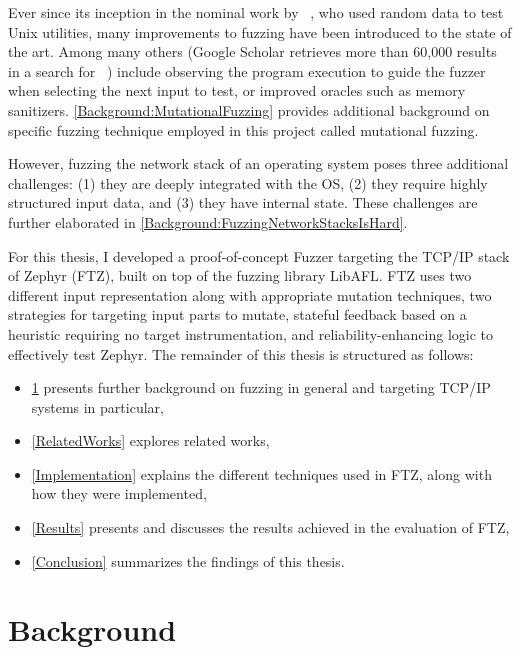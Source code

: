 \documentclass[twocolumn]{article}
\newcommand{\proj}{FTZ\xspace}
\let\savedCite=\cite
\renewcommand{\cite}{\unskip~\savedCite}
\begin{document}
Ever since its inception in the nominal work by \citeauthor{UNIX}\cite{UNIX}, who used random data to test Unix utilities, many improvements to fuzzing have been introduced to the state of the art. Among many others (Google Scholar retrieves more than 60,000 results in a search for \cite{GoogleScholarFuzzing}) include observing the program execution to guide the fuzzer when selecting the next input to test, or improved oracles such as memory sanitizers. \cref{Background:MutationalFuzzing} provides additional background on specific fuzzing technique employed in this project called mutational fuzzing.

However, fuzzing the network stack of an operating system poses three additional challenges: (1) they are deeply integrated with the OS, (2) they require highly structured input data, and (3) they have internal state. These challenges are further elaborated in \cref{Background:FuzzingNetworkStacksIsHard}.

For this thesis, I developed a proof-of-concept Fuzzer targeting the TCP/IP stack of Zephyr (\proj), built on top of the fuzzing library LibAFL. \proj uses two different input representation along with appropriate mutation techniques, two strategies for targeting input parts to mutate, stateful feedback based on a heuristic requiring no target instrumentation, and reliability-enhancing logic to effectively test Zephyr. The remainder of this thesis is structured as follows:

\begin{itemize}
  \item \cref{Background} presents further background on fuzzing in general and targeting TCP/IP systems in particular,
  \item \cref{RelatedWorks} explores related works,
  \item \cref{Implementation} explains the different techniques used in \proj, along with how they were implemented,
  \item \cref{Results} presents and discusses the results achieved in the evaluation of \proj,
  \item \cref{Conclusion} summarizes the findings of this thesis.
\end{itemize}


\section{Background}
\label{Background}
\end{document}
